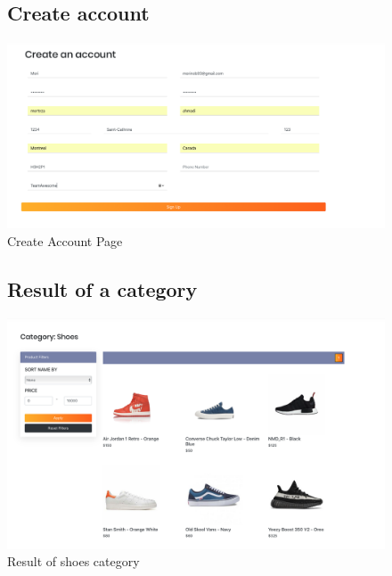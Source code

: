 \documentclass[11pt]{article}
\begin{document}
\begin{figure}[ht!]
    \subsection{Create account}
    \centering
    \includegraphics[width=\textwidth,height=0.3\paperheight,keepaspectratio]{Diagrams/External_Interfaces/Create_Account.png} 
    \caption{Create Account Page}
    \label{fig: Create Account Page}
\end{figure}
\FloatBarrier


\begin{figure}[ht!]
    \subsection{Result of a category}
    \centering
    \includegraphics[width=\textwidth,height=3\paperheight,keepaspectratio]{Diagrams/External_Interfaces/Categories.png} 
    \caption{Result of shoes category}
    \label{fig: Result of a category}
\end{figure}
\FloatBarrier
\end{document}
